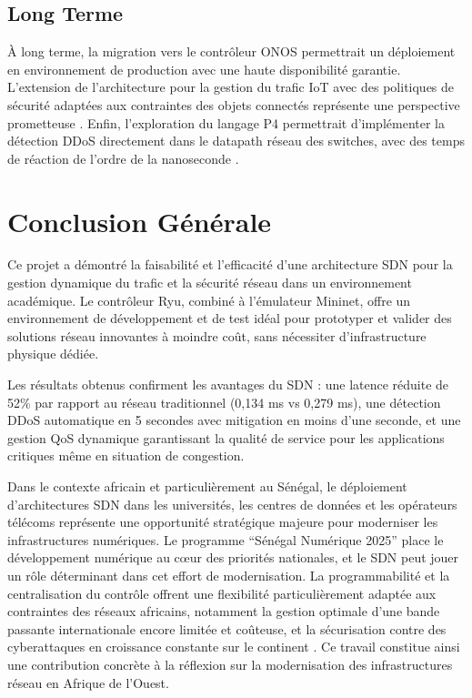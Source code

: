 \documentclass[12pt,a4paper]{report}
\begin{document}
\subsection{Long Terme}
À long terme, la migration vers le contrôleur ONOS
permettrait un déploiement en environnement de production
avec une haute disponibilité garantie. L'extension de
l'architecture pour la gestion du trafic IoT avec des
politiques de sécurité adaptées aux contraintes des
objets connectés représente une perspective prometteuse
\cite{abubakar2021iot}. Enfin, l'exploration du langage
P4 permettrait d'implémenter la détection DDoS
directement dans le datapath réseau des switches, avec
des temps de réaction de l'ordre de la nanoseconde
\cite{bosshart2014p4}.

\section{Conclusion Générale}
Ce projet a démontré la faisabilité et l'efficacité d'une
architecture SDN pour la gestion dynamique du trafic et
la sécurité réseau dans un environnement académique. Le
contrôleur Ryu, combiné à l'émulateur Mininet, offre un
environnement de développement et de test idéal pour
prototyper et valider des solutions réseau innovantes à
moindre coût, sans nécessiter d'infrastructure physique
dédiée.

Les résultats obtenus confirment les avantages du SDN :
une latence réduite de 52\% par rapport au réseau
traditionnel (0,134 ms vs 0,279 ms), une détection DDoS
automatique en 5 secondes avec mitigation en moins d'une
seconde, et une gestion QoS dynamique garantissant la
qualité de service pour les applications critiques
même en situation de congestion.

Dans le contexte africain et particulièrement au Sénégal,
le déploiement d'architectures SDN dans les universités,
les centres de données et les opérateurs télécoms
représente une opportunité stratégique majeure pour
moderniser les infrastructures numériques. Le programme
``Sénégal Numérique 2025'' place le développement
numérique au cœur des priorités nationales, et le SDN
peut jouer un rôle déterminant dans cet effort de
modernisation. La programmabilité et la centralisation
du contrôle offrent une flexibilité particulièrement
adaptée aux contraintes des réseaux africains, notamment
la gestion optimale d'une bande passante internationale
encore limitée et coûteuse, et la sécurisation contre
des cyberattaques en croissance constante sur le continent
\cite{ndiaye2022sdn}. Ce travail constitue ainsi une
contribution concrète à la réflexion sur la modernisation
des infrastructures réseau en Afrique de l'Ouest.
\end{document}
